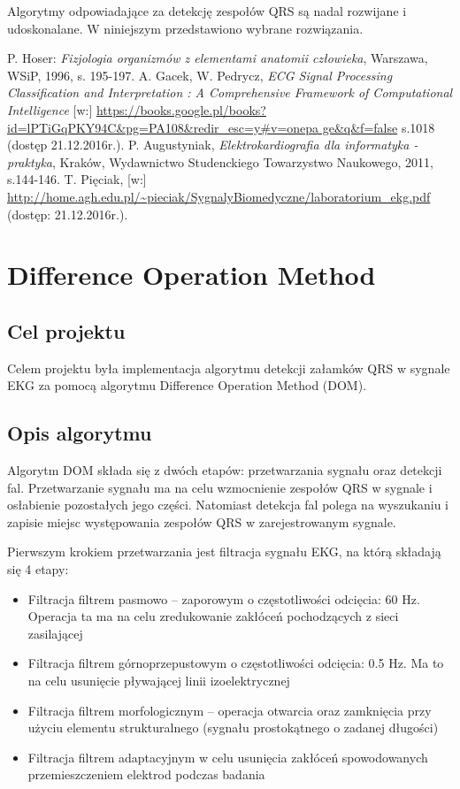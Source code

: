 \documentclass[10pt,a4paper]{article}
\begin{document}
Algorytmy odpowiadające za detekcję zespołów QRS są nadal rozwijane i udoskonalane. W niniejszym przedstawiono wybrane rozwiązania.

\newpage
\begin{thebibliography}{9}
 P. Hoser: \emph{Fizjologia organizmów z elementami anatomii człowieka}, Warszawa, WSiP, 1996, s. 195-197.
 A. Gacek, W. Pedrycz, \emph{ECG Signal Processing Classification and Interpretation : A Comprehensive Framework of Computational Intelligence} [w:] \url{https://books.google.pl/books?id=lPTiGqPKY94C&pg=PA108&redir_esc=y#v=onepa
ge&q&f=false} s.1018 (dostęp 21.12.2016r.).
 P. Augustyniak, \emph{Elektrokardiografia dla informatyka - praktyka}, Kraków, Wydawnictwo Studenckiego Towarzystwo Naukowego, 2011, s.144-146.
 T. Pięciak, [w:] \url{http://home.agh.edu.pl/~pieciak/SygnalyBiomedyczne/laboratorium_ekg.pdf} (dostęp: 21.12.2016r.).

\end{thebibliography}
\newpage
\section{Difference Operation Method}
\subsection{Cel projektu}

Celem projektu była implementacja algorytmu detekcji załamków QRS w sygnale EKG za pomocą algorytmu Difference Operation Method (DOM). 

\subsection{Opis algorytmu}\cite{domB1}

Algorytm DOM składa się z dwóch etapów: przetwarzania sygnału oraz detekcji fal. Przetwarzanie sygnału ma na celu wzmocnienie zespołów QRS w sygnale i osłabienie pozostałych jego części. Natomiast detekcja fal polega na wyszukaniu i zapisie miejsc występowania zespołów QRS w zarejestrowanym sygnale.

Pierwszym krokiem przetwarzania jest filtracja sygnału EKG, na którą składają się 4 etapy:

\begin{itemize}
	\item Filtracja filtrem pasmowo – zaporowym o częstotliwości odcięcia: 60 Hz. Operacja ta ma na celu zredukowanie zakłóceń pochodzących z sieci zasilającej
	\item Filtracja filtrem górnoprzepustowym o częstotliwości odcięcia: 0.5 Hz. Ma to na celu usunięcie pływającej linii izoelektrycznej
	\item Filtracja filtrem morfologicznym – operacja otwarcia oraz zamknięcia przy użyciu elementu strukturalnego (sygnału prostokątnego o zadanej długości) 
	\item Filtracja filtrem adaptacyjnym w celu usunięcia zakłóceń spowodowanych przemieszczeniem elektrod podczas badania
\end{itemize}
\end{document}
